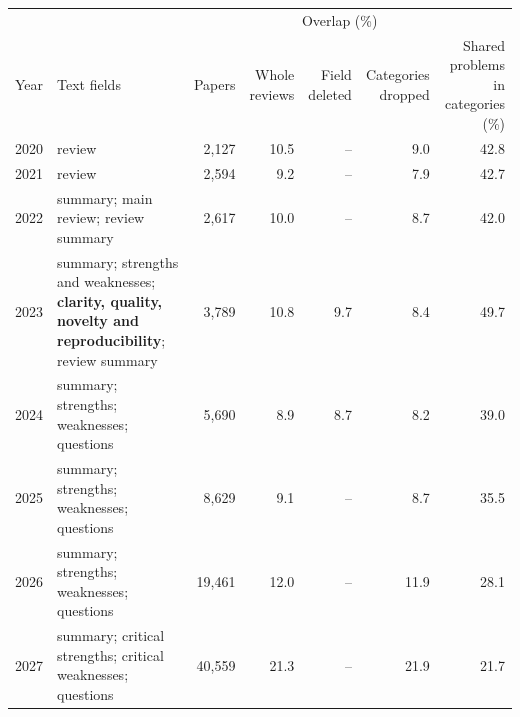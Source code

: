 \begin{tabular}{@{}l>{\raggedright\arraybackslash}p{5.6cm}rrrrr@{}}
\toprule
 & & & \multicolumn{3}{c}{Overlap (\%)} & \\
\cmidrule(lr){4-6}
Year & Text fields & Papers & \shortstack[r]{Whole\\reviews} & \shortstack[r]{Field\\deleted} & \shortstack[r]{Categories\\dropped} & \shortstack[r]{Shared problems\\in categories (\%)} \\
\midrule
2020 & review & 2,127 & 10.5 & -- & 9.0 & 42.8 \\
2021 & review & 2,594 & 9.2 & -- & 7.9 & 42.7 \\
2022 & summary; main review; review summary & 2,617 & 10.0 & -- & 8.7 & 42.0 \\
2023 & summary; strengths and weaknesses; \textbf{clarity, quality, novelty and reproducibility}; review summary & 3,789 & 10.8 & 9.7 & 8.4 & 49.7 \\
2024 & summary; strengths; weaknesses; questions & 5,690 & 8.9 & 8.7 & 8.2 & 39.0 \\
2025 & summary; strengths; weaknesses; questions & 8,629 & 9.1 & -- & 8.7 & 35.5 \\
2026 & summary; strengths; weaknesses; questions & 19,461 & 12.0 & -- & 11.9 & 28.1 \\
2027 & summary; critical strengths; critical weaknesses; questions & 40,559 & 21.3 & -- & 21.9 & 21.7 \\
\bottomrule
\end{tabular}
